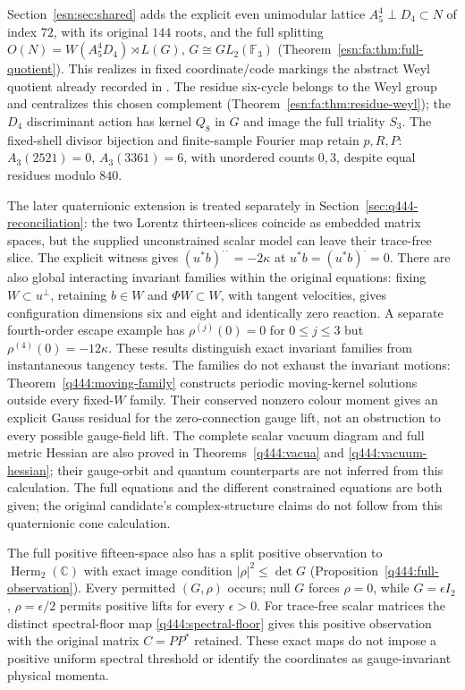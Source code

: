 Section~\ref{esn:sec:shared} adds the explicit even unimodular lattice
$A_5^4\perp D_4\subset N$ of index $72$, with its original $144$ roots,
and the full splitting $O(N)=W(A_5^4D_4)\rtimes L(G)$,
$G\cong GL_2(\mathbb F_3)$
(Theorem~\ref{esn:fa:thm:full-quotient}). This realizes in fixed
coordinate/code markings the abstract Weyl quotient already recorded in
\cite[Table~3]{esn:CDH2014}. The residue six-cycle belongs to the Weyl
group and centralizes this chosen complement
(Theorem~\ref{esn:fa:thm:residue-weyl}); the $D_4$ discriminant action
has kernel $Q_8$ in $G$ and image the full triality $S_3$.
The fixed-shell divisor bijection and finite-sample Fourier map retain
$p,R,P$: $A_3(2521)=0$, $A_3(3361)=6$, with unordered counts $0,3$,
despite equal residues modulo $840$.

The later quaternionic extension is treated separately in
Section~\ref{sec:q444-reconciliation}: the two Lorentz thirteen-slices
coincide as embedded matrix spaces, but the supplied unconstrained scalar
model can leave their trace-free slice. The explicit witness gives
$(u^*b)^{\cdot\cdot}=-2\kappa$ at $u^*b=(u^*b)^{\cdot}=0$.
There are also global interacting invariant families within the original
equations: fixing $W\subset u^\perp$, retaining $b\in W$ and
$\Phi W\subset W$, with tangent velocities, gives configuration dimensions
six and eight and identically zero reaction. A separate fourth-order
escape example has $\rho^{(j)}(0)=0$ for $0\leq j\leq3$ but
$\rho^{(4)}(0)=-12\kappa$. These results distinguish exact invariant
families from instantaneous tangency tests. The families do not exhaust
the invariant motions: Theorem~\ref{q444:moving-family} constructs
periodic moving-kernel solutions outside every fixed-$W$ family.
Their conserved nonzero colour moment gives an explicit Gauss residual
for the zero-connection gauge lift, not an obstruction to every possible
gauge-field lift. The complete scalar vacuum diagram and full metric
Hessian are also proved in Theorems~\ref{q444:vacua} and
\ref{q444:vacuum-hessian}; their gauge-orbit and quantum counterparts are
not inferred from this calculation.
The full equations and the different constrained equations are both given;
the original candidate's complex-structure claims do not follow from this
quaternionic cone calculation.

The full positive fifteen-space also has a split positive observation to
$\operatorname{Herm}_2(\mathbb C)$ with exact image condition
$|\rho|^2\leq\det G$ (Proposition~\ref{q444:full-observation}).
Every permitted $(G,\rho)$ occurs; null $G$ forces $\rho=0$, while
$G=\epsilon I_2$, $\rho=\epsilon/2$ permits positive lifts for every
$\epsilon>0$. For trace-free scalar matrices the distinct spectral-floor
map \eqref{q444:spectral-floor} gives this positive observation with the
original matrix $C=PP^*$ retained. These exact maps do not impose a
positive uniform spectral threshold or identify the coordinates as
gauge-invariant physical momenta.

